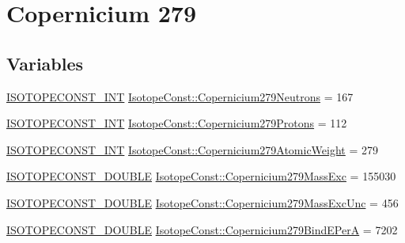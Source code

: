 \hypertarget{group___isotope_const-_copernicium-_cn279}{}\section{Copernicium 279}
\label{group___isotope_const-_copernicium-_cn279}
\subsection*{Variables}
\begin{DoxyCompactItemize}
\item 
\mbox{\hyperlink{group___isotope_const-_macros_ga5f18360b3e99483a35c32d789e62621c}{I\+S\+O\+T\+O\+P\+E\+C\+O\+N\+S\+T\+\_\+\+I\+NT}} \mbox{\hyperlink{group___isotope_const-_copernicium-_cn279_ga9314ba7fe0a2f095a6f86ea7193359ab}{Isotope\+Const\+::\+Copernicium279\+Neutrons}} = 167
\item 
\mbox{\hyperlink{group___isotope_const-_macros_ga5f18360b3e99483a35c32d789e62621c}{I\+S\+O\+T\+O\+P\+E\+C\+O\+N\+S\+T\+\_\+\+I\+NT}} \mbox{\hyperlink{group___isotope_const-_copernicium-_cn279_ga166692c29c177a0807ca211710b8d131}{Isotope\+Const\+::\+Copernicium279\+Protons}} = 112
\item 
\mbox{\hyperlink{group___isotope_const-_macros_ga5f18360b3e99483a35c32d789e62621c}{I\+S\+O\+T\+O\+P\+E\+C\+O\+N\+S\+T\+\_\+\+I\+NT}} \mbox{\hyperlink{group___isotope_const-_copernicium-_cn279_ga9401222b2ee32d43c5abd32848050cd4}{Isotope\+Const\+::\+Copernicium279\+Atomic\+Weight}} = 279
\item 
\mbox{\hyperlink{group___isotope_const-_macros_ga8f45a7272ce02c0b4c65c44636ed719a}{I\+S\+O\+T\+O\+P\+E\+C\+O\+N\+S\+T\+\_\+\+D\+O\+U\+B\+LE}} \mbox{\hyperlink{group___isotope_const-_copernicium-_cn279_gadec08420c6d7d85b190cbe47e9d2bef0}{Isotope\+Const\+::\+Copernicium279\+Mass\+Exc}} = 155030
\item 
\mbox{\hyperlink{group___isotope_const-_macros_ga8f45a7272ce02c0b4c65c44636ed719a}{I\+S\+O\+T\+O\+P\+E\+C\+O\+N\+S\+T\+\_\+\+D\+O\+U\+B\+LE}} \mbox{\hyperlink{group___isotope_const-_copernicium-_cn279_ga1037336228145c5ae2f1b4c997bb9a94}{Isotope\+Const\+::\+Copernicium279\+Mass\+Exc\+Unc}} = 456
\item 
\mbox{\hyperlink{group___isotope_const-_macros_ga8f45a7272ce02c0b4c65c44636ed719a}{I\+S\+O\+T\+O\+P\+E\+C\+O\+N\+S\+T\+\_\+\+D\+O\+U\+B\+LE}} \mbox{\hyperlink{group___isotope_const-_copernicium-_cn279_gaf5fe4207a96119d5c1da84387195aa18}{Isotope\+Const\+::\+Copernicium279\+Bind\+E\+PerA}} = 7202

\end{DoxyCompactItemize}

